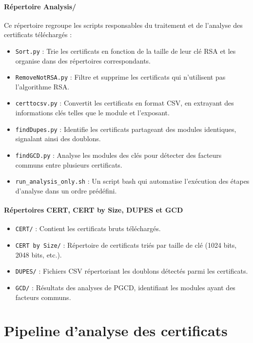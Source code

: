 \documentclass[11pt,a4paper]{article}
\begin{document}
\paragraph{Répertoire Analysis/}
Ce répertoire regroupe les scripts responsables du traitement et de l'analyse des certificats téléchargés :
\begin{itemize}
    \item \texttt{Sort.py} : Trie les certificats en fonction de la taille de leur clé RSA et les organise dans des répertoires correspondants.
    \item \texttt{RemoveNotRSA.py} : Filtre et supprime les certificats qui n'utilisent pas l'algorithme RSA.
    \item \texttt{certtocsv.py} : Convertit les certificats en format CSV, en extrayant des informations clés telles que le module et l'exposant.
    \item \texttt{findDupes.py} : Identifie les certificats partageant des modules identiques, signalant ainsi des doublons.
    \item \texttt{findGCD.py} : Analyse les modules des clés pour détecter des facteurs communs entre plusieurs certificats.
    \item \texttt{run_analysis_only.sh} : Un script bash qui automatise l'exécution des étapes d'analyse dans un ordre prédéfini.
\end{itemize}

\paragraph{Répertoires CERT, CERT by Size, DUPES et GCD}
\begin{itemize}
    \item \texttt{CERT/} : Contient les certificats bruts téléchargés.
    \item \texttt{CERT by Size/} : Répertoire de certificats triés par taille de clé (1024 bits, 2048 bits, etc.).
    \item \texttt{DUPES/} : Fichiers CSV répertoriant les doublons détectés parmi les certificats.
    \item \texttt{GCD/} : Résultats des analyses de PGCD, identifiant les modules ayant des facteurs communs.
\end{itemize}

\section{Pipeline d'analyse des certificats}
\end{document}
